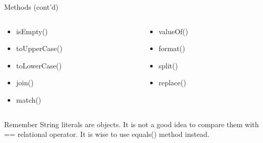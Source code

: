 \documentclass[10pt, compress]{beamer}
\begin{document}
\begin{slide}
	\begin{block}{Methods (cont'd)}
		\begin{columns}
			\begin{column}{0.5\textwidth}
				\begin{itemize}
					\item[] isEmpty()
					\item[] toUpperCase()
					\item[] toLowerCase()
					\item[] join()
					\item[] match()
				\end{itemize}
			\end{column}
			\begin{column}{0.5\textwidth}
				\begin{itemize}
					\item[] valueOf()
					\item[] format()
					\item[] split()
					\item[] replace()
				\end{itemize}
			\end{column}
		\end{columns}
	\end{block}
	\begin{block}{Remember}
		String literals are objects. It is not a good idea to compare them with ={}= relational operator. It is wise to use equals() method instead.
	\end{block}
\end{slide}

\end{document}
